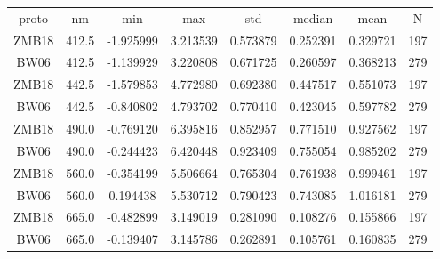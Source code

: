 \documentclass[preview]{standalone}
\begin{document}
\tiny

\begin{table}
\begin{tabular}{cccccccc}


proto & nm & min & max & std & median & mean & N\\
ZMB18 & 412.5 & -1.925999 & 3.213539 & 0.573879 & 0.252391 & 0.329721 & 197\\
BW06 & 412.5 & -1.139929 & 3.220808 & 0.671725 & 0.260597 & 0.368213 & 279\\
ZMB18 & 442.5 & -1.579853 & 4.772980 & 0.692380 & 0.447517 & 0.551073 & 197\\
BW06 & 442.5 & -0.840802 & 4.793702 & 0.770410 & 0.423045 & 0.597782 & 279\\
ZMB18 & 490.0 & -0.769120 & 6.395816 & 0.852957 & 0.771510 & 0.927562 & 197\\
BW06 & 490.0 & -0.244423 & 6.420448 & 0.923409 & 0.755054 & 0.985202 & 279\\
ZMB18 & 560.0 & -0.354199 & 5.506664 & 0.765304 & 0.761938 & 0.999461 & 197\\
BW06 & 560.0 & 0.194438 & 5.530712 & 0.790423 & 0.743085 & 1.016181 & 279\\
ZMB18 & 665.0 & -0.482899 & 3.149019 & 0.281090 & 0.108276 & 0.155866 & 197\\
BW06 & 665.0 & -0.139407 & 3.145786 & 0.262891 & 0.105761 & 0.160835 & 279\\

\end{tabular}
\end{table}
\end{document}
